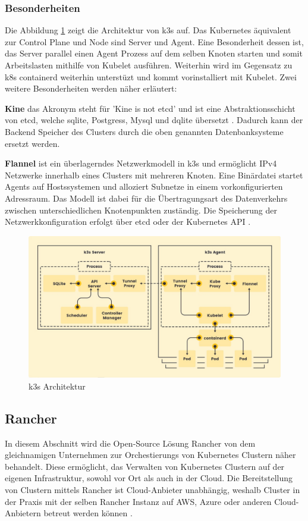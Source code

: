 \subsubsection{Besonderheiten}
Die Abbildung \ref{fig:k3sarchitektur} zeigt die Architektur von k3s auf. Das Kubernetes äquivalent zur Control Plane und Node
sind Server und Agent. Eine Besonderheit dessen ist, das Server parallel einen Agent Prozess auf dem selben Knoten starten und
somit Arbeitslasten mithilfe von Kubelet ausführen. Weiterhin wird im Gegensatz zu k8s containerd weiterhin unterstüzt und
kommt vorinstalliert mit Kubelet. Zwei weitere Besonderheiten werden näher erläutert:

\textbf{Kine}
das Akronym steht für 'Kine is not etcd' und ist eine Abstraktionsschicht von etcd, welche sqlite, Postgress, Mysql und dqlite übersetzt \cite{k3sgit}.
Dadurch kann der Backend Speicher des Clusters durch die oben genannten Datenbanksysteme ersetzt werden.

\textbf{Flannel}
ist ein überlagerndes Netzwerkmodell in k3s und ermöglicht IPv4 Netzwerke innerhalb eines Clusters mit mehreren Knoten.
Eine Binärdatei startet Agents auf Hostssystemen und alloziert Subnetze in einem vorkonfigurierten Adressraum.
Das Modell ist dabei für die Übertragungsart des Datenverkehrs zwischen unterschiedlichen Knotenpunkten zuständig.
Die Speicherung der Netzwerkkonfiguration erfolgt über etcd oder der Kubernetes API \cite{flannel}.


\begin{figure}
  \centering
  \includegraphics[width=1.0\columnwidth]{images/k3s-architecture.jpeg}
  \caption{k3s Architektur \cite{k3sarch}}
  \label{fig:k3sarchitektur}
\end{figure}

\subsection{Rancher}
In diesem Abschnitt wird die Open-Source Lösung Rancher von dem gleichnamigen Unternehmen zur Orchestierungs von Kubernetes Clustern näher behandelt.
Diese ermöglicht, das Verwalten von Kubernetes Clustern auf der eigenen Infrastruktur, sowohl vor Ort als auch in der Cloud.
Die Bereitstellung von Clustern mittels Rancher ist Cloud-Anbieter unabhängig,
weshalb Cluster in der Praxis mit der selben Rancher Instanz auf AWS, Azure oder anderen Cloud-Anbietern betreut werden können \cite{rancher}.

